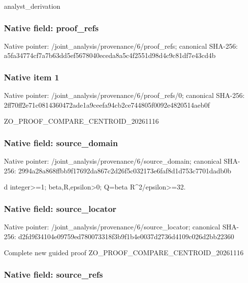 \documentclass[10pt,a4paper]{article}
\begin{document}
analyst\_derivation


\subsubsection{Native field: proof\_refs}


Native pointer: /joint\_analysis/provenance/6/proof\_refs; canonical SHA-256: a5fa34774cf7a7b63dd5ef56\allowbreak{}78040eceda8a5c4f2551d98d\allowbreak{}4c9c81df7e43cd4b



\subsubsection{Native item 1}


Native pointer: /joint\_analysis/provenan\allowbreak{}ce/6/proof\_refs/0; canonical SHA-256: 2ff70ff2e71c0814360472ad\allowbreak{}e1a9ceefa94cb2ce744805f0\allowbreak{}092e4820514aeb0f


ZO\_PROOF\_COMPARE\_CENTROID\_20261116


\subsubsection{Native field: source\_domain}


Native pointer: /joint\_analysis/provenan\allowbreak{}ce/6/source\_domain; canonical SHA-256: 2994a28a868ffbb9f17692da\allowbreak{}867c2d26f5c032173e6faf8d\allowbreak{}1d753c7701dadb0b


d integer>=1; beta,R,epsilon>0; Q=beta R\textasciicircum{}2/epsilon>=32.


\subsubsection{Native field: source\_locator}


Native pointer: /joint\_analysis/provenan\allowbreak{}ce/6/source\_locator; canonical SHA-256: d2fd9f34104e09759ed78007\allowbreak{}3318f3b9f1b4e0037d2736d4\allowbreak{}109c026d2bb22360


Complete new guided proof ZO\_PROOF\_COMPARE\_CENTROID\_20261116


\subsubsection{Native field: source\_refs}
\end{document}
